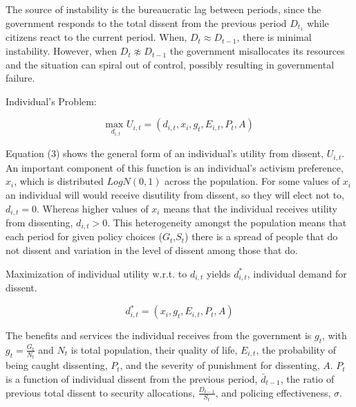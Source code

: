 \documentclass[12pt]{article}
\begin{document}
\begin{spacing}{1.5}
The source of instability is the bureaucratic lag between periods, since the government responds to the total dissent from the previous period $D_{t_1}$ while citizens react to the current period. When, $D_t \approx D_{t-1}$, there is minimal instability. However, when $D_t \not\approx D_{t-1}$ the government misallocates its resources and the situation can spiral out of control, possibly resulting in governmental failure. 

\vspace{.5 em}
\noindent Individual's Problem:

\begin{equation}
{\underset{d_{i,t}}{\text{max }}}  U_{i,t}= (d_{i,t},x_i,g_t, E_{i,t},P_t, A)
\end{equation}

Equation (3) shows the general form of an individual's utility from dissent, $U_{i,t}$. An important component of this function is an individual's activism preference, $x_i$, which is distributed $LogN(0,1)$ across the population. For some values of $x_i$ an individual will would receive disutility from dissent, so they will elect not to, $d_{i,t}=0$. Whereas higher values of $x_i$ means that the individual receives utility from dissenting, $d_{i,t}>0$. This heterogeneity amongst the population means that each period for given policy choices ($G_t$,$S_t$) there is a spread of people that do not dissent and variation in the level of dissent among those that do.  

Maximization of individual utility w.r.t. to $d_{i,t}$ yields $d_{i,t}^*$, individual demand for dissent.  

\vspace{.5 em}

\begin{equation}
d_{i,t}^*=(x_i,g_t,E_{i,t},P_t,A)
\end{equation}

The benefits and services the individual receives from the government is $g_t$, with $g_t=\frac{G_t}{N_t}$ and $N_t$ is total population, their quality of life, $E_{i,t}$, the probability of being caught dissenting, $P_t$, and the severity of punishment for dissenting, $A$. $P_t$  is a function of individual dissent from the previous period, $\bar{d}_{t-1}$, the ratio of previous total dissent to security allocations, $\frac{D_{t-1}}{S_t}$, and policing effectiveness, $\sigma$. 


\end{spacing}
\end{document}
